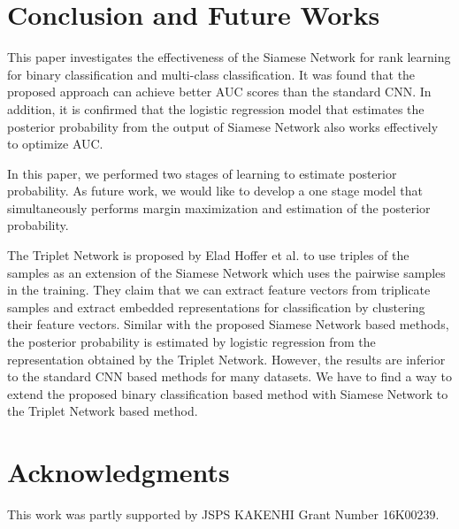 \documentclass[runningheads,a4paper]{llncs}
\begin{document}
\section{Conclusion and Future Works}
\label{sec:conclusion}

This paper investigates the effectiveness of the Siamese Network for rank learning for binary classification and multi-class classification.
It was found that the proposed approach can achieve better AUC scores than the standard CNN.
In addition, it is confirmed that the logistic regression model that estimates the posterior probability from the output of Siamese Network also works effectively to optimize AUC.

In this paper, we performed two stages of learning to estimate posterior probability.
As future work, we would like to develop a one stage model that simultaneously performs margin maximization and estimation of the posterior probability.

The Triplet Network is proposed by Elad Hoffer et al. \cite{triplet} to use triples of the samples as an extension of the Siamese Network which uses the pairwise samples in the training.
They claim that we can extract feature vectors from triplicate samples and extract embedded representations for classification by clustering their feature vectors.
Similar with the proposed Siamese Network based methods, the posterior probability is estimated by logistic regression from the representation obtained by the Triplet Network.
However, the results are inferior to the standard CNN based methods for many datasets.
We have to find a way to extend the proposed binary classification based method with Siamese Network to the Triplet Network based method.


\section*{Acknowledgments} 

This work was partly supported by JSPS KAKENHI Grant Number 16K00239.
\end{document}
